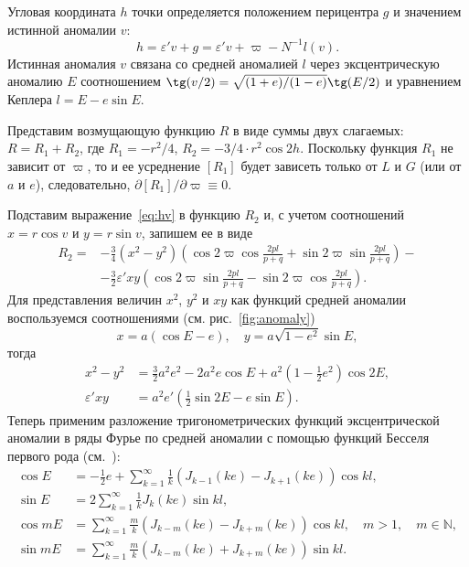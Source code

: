 \documentclass[14pt,a4paper%
]{extarticle}
\begin{document}
Угловая координата $h$ точки определяется положением перицентра $g$ и значением истинной аномалии $v$:
\begin{equation}\label{eq:hv}
h=\varepsilon'v+g=\varepsilon'v+\varpi-N^{-1}l(v).
\end{equation}
Истинная аномалия $v$ связана со средней аномалией $l$ через эксцентрическую аномалию $E$ соотношением
$\tg({v}/{2})=\sqrt{({1+e})/({1-e})}\tg({E}/{2})$
и уравнением Кеплера $l=E-e\sin E$.

Представим возмущающую функцию $R$ в виде суммы двух слагаемых: $R=R_1+R_2$, где $R_1=-r^2/4$, $R_2=-3/4\cdot r^2\cos2h$. Поскольку функция $R_1$ не зависит от $\varpi$, то и ее усреднение $[R_1]$ будет зависеть только от $L$ и $G$ (или от $a$ и $e$), следовательно, $\partial[R_1]/\partial\varpi\equiv0$.\label{ref:R1}

Подставим выражение~\eqref{eq:hv} в функцию $R_2$ и, с учетом соотношений $x=r\cos v$ и $y=r\sin v$, запишем ее в виде
\begin{equation}\label{eq:R2}
\begin{split}
R_2=&-\frac34\left(x^2-y^2\right)\left(\cos2\varpi\cos\frac{2pl}{p+q}+\sin2\varpi\sin\frac{2pl}{p+q}\right)-\\
{}&-\frac32\varepsilon'xy\left(\cos2\varpi\sin\frac{2pl}{p+q}-\sin2\varpi\cos\frac{2pl}{p+q}\right).
\end{split}
\end{equation}
Для представления величин $x^2$, $y^2$ и $xy$ как функций средней аномалии воспользуемся соотношениями (см. рис.~\ref{fig:anomaly})
\begin{equation}
x=a\left(\cos E-e\right),\quad y=a\sqrt{1-e^2}\sin E,
\end{equation}
тогда
\begin{align}
x^2-y^2&=\frac32a^2e^2 -2a^2e\cos E+a^2\left(1-\frac{1}{2}e^2\right)\cos2E,\label{eq:x2y2}\\
\varepsilon'xy&=a^2e'\left(\frac12\sin2E-e\sin E\right).\label{eq:xy}
\end{align}
Теперь применим разложение тригонометрических функций эксцентрической аномалии в ряды Фурье по средней аномалии с помощью функций Бесселя первого рода (см.~\cite[гл.~VI, \S~5]{Subbotin}):
\begin{align}
\cos E&=-\frac12e+\sum_{k=1}^\infty\frac{1}{k}\left(J_{k-1}(ke)-J_{k+1}(ke)\right)\cos kl,\label{eq:cosE}\\
\sin E&=2\sum_{k=1}^\infty \frac1k J_k(ke)\sin kl,\label{eq:SinE}\\
\cos mE&=\sum_{k=1}^\infty\frac{m}{k}\left(J_{k-m}(ke)-J_{k+m}(ke)\right)\cos kl,\quad m>1,\quad m\in\mathbb N,\label{eq:cosmE} \\
\sin mE&=\sum_{k=1}^\infty\frac{m}{k}\left(J_{k-m}(ke)+J_{k+m}(ke)\right)\sin kl.\label{eq:sinmE}
\end{align}
\end{document}
